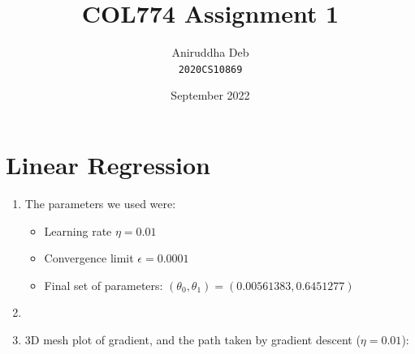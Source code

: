 \documentclass[12pt]{article}
\title{\textbf{COL774 Assignment 1}}
\author{Aniruddha Deb \\ \texttt{2020CS10869}}
\date{September 2022}
\begin{document}
\maketitle

\section*{Linear Regression}

\begin{enumerate}[label=(\alph*)]
    \item The parameters we used were:
    \begin{itemize}
        \item Learning rate $\eta = 0.01$
        \item Convergence limit $\epsilon = 0.0001$
        \item Final set of parameters: $(\theta_0,\theta_1) = (0.00561383,0.6451277)$
    \end{itemize}

    \item \begin{center}\end{center}

    \clearpage

    \item \begin{center}3D mesh plot of gradient, and the path taken by gradient descent ($\eta = 0.01$): \end{center}


\end{enumerate}
\end{document}
